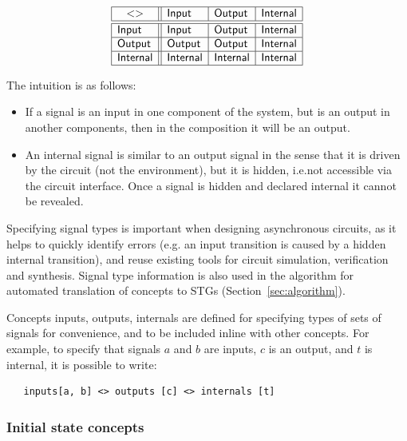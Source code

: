 \documentclass[british,conference,compsoc]{IEEEtran}
\begin{document}
\vspace{-2mm}

\[
\begin{array}{|l||l|l|l|}
\hline
\multicolumn{1}{|c||}{<>} & \mathsf{Input} & \mathsf{Output} &
\mathsf{Internal} \\ \hline \hline
\mathsf{Input} & \mathsf{Input} & \mathsf{Output} & \mathsf{Internal} \\ \hline
\mathsf{Output} & \mathsf{Output} & \mathsf{Output} & \mathsf{Internal} \\
\hline
\mathsf{Internal}& \mathsf{Internal} & \mathsf{Internal} & \mathsf{Internal} \\
\hline
\end{array}
\]

The intuition is as follows:
\begin{itemize}
    \item If a signal is an input in one component of the system, but is an
    output in another components, then in the composition it will be an output.
    \item An internal signal is similar to an output signal in the sense
that it is driven by the circuit (not the environment), but it is hidden, 
i.e.not accessible via the circuit interface. Once a signal is hidden and 
declared internal it cannot be revealed.
\end{itemize}

\noindent Specifying signal types is important when designing asynchronous
circuits, as it helps to quickly identify errors (e.g. an input transition is
caused by a hidden internal transition), and reuse existing tools for circuit
simulation, verification and synthesis. Signal type information is also used
in the algorithm for automated translation of concepts to
STGs (Section~\ref{sec:algorithm}).

Concepts \textsf{inputs}, \textsf{outputs}, \textsf{internals} are defined for
specifying types of sets of signals for convenience, and to be included inline 
with other concepts. For example, to specify that signals $a$ and $b$ are 
inputs, $c$ is an output, and $t$ is internal, it is possible to write:

\begin{lstlisting}
   inputs[a, b] <> outputs [c] <> internals [t]
\end{lstlisting}

\subsubsection{Initial state concepts\label{sub:initState}}
\end{document}
